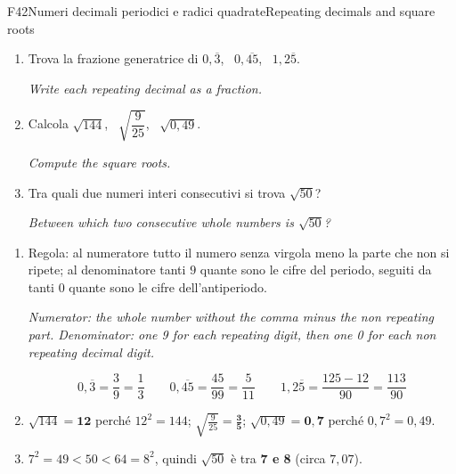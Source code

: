 \documentclass[11pt,a4paper]{article}
\newcommand{\en}[1]{\par{\small\itshape\color{engray}#1\par}}
\begin{document}
\begin{esercizio}{F4}{2}{Numeri decimali periodici e radici quadrate}{Repeating decimals and square roots}
\begin{enumerate}
\item Trova la frazione generatrice di $0,\overline{3}$, \ $0,\overline{45}$, \ $1,2\overline{5}$.
\en{Write each repeating decimal as a fraction.}
\item Calcola $\sqrt{144}$, \ $\sqrt{\dfrac{9}{25}}$, \ $\sqrt{0,49}$.
\en{Compute the square roots.}
\item Tra quali due numeri interi consecutivi si trova $\sqrt{50}$?
\en{Between which two consecutive whole numbers is $\sqrt{50}$?}
\end{enumerate}
\end{esercizio}
\begin{solbox}
\begin{enumerate}
\item Regola: al numeratore tutto il numero senza virgola meno la parte che non si ripete; al denominatore tanti $9$ quante sono le cifre del periodo, seguiti da tanti $0$ quante sono le cifre dell'antiperiodo.
\en{Numerator: the whole number without the comma minus the non repeating part. Denominator: one 9 for each repeating digit, then one 0 for each non repeating decimal digit.}
\[0,\overline{3}=\frac39=\frac13\qquad 0,\overline{45}=\frac{45}{99}=\frac{5}{11}\qquad 1,2\overline{5}=\frac{125-12}{90}=\frac{113}{90}\]
\item $\sqrt{144}=\mathbf{12}$ perché $12^2=144$; \quad $\sqrt{\frac{9}{25}}=\mathbf{\frac35}$; \quad $\sqrt{0,49}=\mathbf{0,7}$ perché $0,7^2=0,49$.
\item $7^2=49<50<64=8^2$, quindi $\sqrt{50}$ è tra \textbf{7 e 8} (circa $7,07$).
\end{enumerate}
\end{solbox}
\end{document}
